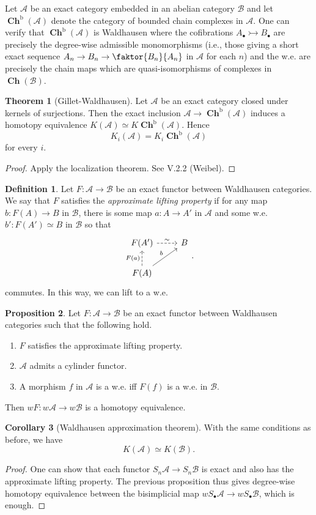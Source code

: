 \documentclass[10pt,letterpaper,cm]{nupset}
\theoremstyle{definition}
\newtheorem{definition}{Definition}
\theoremstyle{theorem}
\newtheorem{theorem}{Theorem}
\newtheorem{prop}[theorem]{Proposition}
\newtheorem{corollary}[theorem]{Corollary}
\theoremstyle{remark}
\newcommand{\1}{\mathbf{1}}
\renewcommand{\a}{\mathscr{A}}
\renewcommand{\b}{\mathscr{B}}
\newcommand{\0}{\vec 0}
\DeclareMathOperator{\bo}{b}
\DeclareMathOperator{\ch}{\mathbf{Ch}}
\begin{document}
\smallskip

Let $\a$ be an exact category embedded in an abelian category $\b$ and let $\ch^{\bo}(\a)$ denote the category of bounded chain complexes in $\a$. One can verify that $\ch^{\bo}(\a)$ is Waldhausen where the cofibrations $A_{\bullet} \rightarrowtail B_{\bullet}$ are precisely the degree-wise admissible monomorphisms (i.e., those giving a short exact sequence $A_n \to B_n \to \faktor{B_n}{A_n}$ in $\a$ for each $n$) and the w.e. are precisely the chain maps which are quasi-isomorphisms of complexes in $\ch(\b)$.


\begin{theorem}[Gillet-Waldhausen]
Let $\a$ be an exact category closed under kernels of surjections. Then the exact inclusion $\a \to \ch^{\bo}(\a)$ induces a homotopy equivalence $K(\a) \simeq K\ch^{\bo}(\a)$. Hence $$K_i(\a) = K_i \ch^{\bo}(\a)$$ for every $i$.
\end{theorem}
\begin{proof}
Apply the localization theorem. See V.2.2 (Weibel).
\end{proof}

\begin{definition}
Let $F: \a \to \b$ be an exact functor between Waldhausen categories. We say that $F$ satisfies the \textit{approximate lifting property} if for any map $b: F(A) \to B$ in $\b$, there is some map $a : A \to A'$ in $\a$ and some w.e. $b' : F(A') \simeq B$ in $\b$ so that
\[
\begin{tikzcd}
F(A') \arrow[r, "\sim", dashed] & B \\
F(A) \arrow[u, "F(a)", dashed] \arrow[ru, "b"] & 
\end{tikzcd}.
\]
commutes. In this way, we can lift to  a w.e.
\end{definition}

\begin{prop}
Let $F: \a \to \b$ be an exact functor between Waldhausen categories such that the following hold.
\begin{enumerate}
\item $F$ satisfies the approximate lifting property.
\item $\a$ admits a cylinder functor.
\item A morphism $f$ in $\a$ is a w.e. iff $F(f)$ is a w.e. in $\b$.
\end{enumerate}
Then $wF : w \a \to w\b$ is a homotopy equivalence.
\end{prop}

\begin{corollary}[Waldhausen approximation theorem]
With the same conditions as before, we have $$K(\a) \simeq K(\b).$$
\end{corollary}
\begin{proof}
One can show that each functor $S_n \a \to S_n \b$ is exact and also has the approximate lifting property.  The previous proposition thus gives degree-wise homotopy equivalence between the bisimplicial map $wS_{\bullet}\a \to wS_{\bullet} \b$, which is enough. 
\end{proof}
\end{document}
